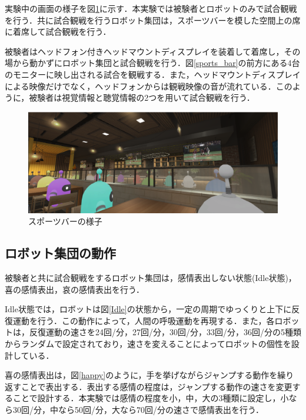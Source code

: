 実験中の画面の様子を図\ref{bar_scene}に示す．本実験では被験者とロボットのみで試合観戦を行う．共に試合観戦を行うロボット集団は，スポーツバーを模した空間上の席に着席して試合観戦を行う．

被験者はヘッドフォン付きヘッドマウントディスプレイを装着して着席し，その場から動かずにロボット集団と試合観戦を行う．図\ref{sports_bar}の前方にある4台のモニターに映し出される試合を観戦する．また，ヘッドマウントディスプレイによる映像だけでなく，ヘッドフォンからは観戦映像の音が流れている．このように，被験者は視覚情報と聴覚情報の2つを用いて試合観戦を行う．




\vspace{1cm}
 \begin{figure}[!h]
 \begin{center}
  \centering
  \includegraphics[width=15cm]{images/chapter3/bar_scene.eps}
  \caption{スポーツバーの様子}
  \label{bar_scene}
 \end{center}
\end{figure}



\newpage



\subsection{ロボット集団の動作}
\label{sec3.2.2}

被験者と共に試合観戦をするロボット集団は，感情表出しない状態(Idle状態)，喜の感情表出，哀の感情表出を行う．

Idle状態では，ロボットは図\ref{Idle}の状態から，一定の周期でゆっくりと上下に反復運動を行う．この動作によって，人間の呼吸運動を再現する．また，各ロボットは，反復運動の速さを24回/分，27回/分，30回/分，33回/分，36回/分の5種類からランダムで設定されており，速さを変えることによってロボットの個性を設計している．

喜の感情表出は，図\ref{happy}のように，手を挙げながらジャンプする動作を繰り返すことで表出する．表出する感情の程度は，ジャンプする動作の速さを変更することで設計する．本実験では感情の程度を小，中，大の3種類に設定し，小なら30回/分，中なら50回/分，大なら70回/分の速さで感情表出を行う．

